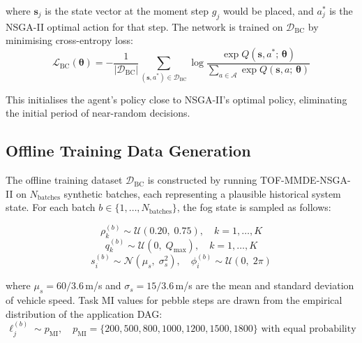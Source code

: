 \documentclass[12pt,a4paper]{article}
\theoremstyle{definition}
\theoremstyle{remark}
\begin{document}
where $\mathbf{s}_j$ is the state vector at the moment step $g_j$ would be
placed, and $a_j^*$ is the NSGA-II optimal action for that step. The network
is trained on $\mathcal{D}_{\text{BC}}$ by minimising cross-entropy loss:
\begin{equation}
  \mathcal{L}_{\text{BC}}(\bm{\theta}) =
  -\frac{1}{|\mathcal{D}_{\text{BC}}|}
  \sum_{(\mathbf{s}, a^*) \in \mathcal{D}_{\text{BC}}}
  \log \frac{\exp Q(\mathbf{s}, a^*;\, \bm{\theta})}
  {\sum_{a \in \mathcal{A}} \exp Q(\mathbf{s}, a;\, \bm{\theta})}
  \label{eq:bc_loss}
\end{equation}

This initialises the agent's policy close to NSGA-II's optimal policy,
eliminating the initial period of near-random decisions.

\subsection{Offline Training Data Generation}

The offline training dataset $\mathcal{D}_{\text{BC}}$ is constructed by
running TOF-MMDE-NSGA-II on $N_{\text{batches}}$ synthetic batches, each
representing a plausible historical system state. For each batch $b \in
\{1,\ldots,N_{\text{batches}}\}$, the fog state is sampled as follows:

\begin{equation}
  \rho_k^{(b)} \sim \mathcal{U}(0.20,\; 0.75),
  \quad k = 1,\ldots,K
  \label{eq:load_sample}
\end{equation}
\begin{equation}
  q_k^{(b)} \sim \mathcal{U}(0,\; Q_{\max}),
  \quad k = 1,\ldots,K
  \label{eq:queue_sample}
\end{equation}
\begin{equation}
  s_i^{(b)} \sim \mathcal{N}(\mu_s,\; \sigma_s^2),
  \quad \phi_i^{(b)} \sim \mathcal{U}(0,\; 2\pi)
  \label{eq:vehicle_sample}
\end{equation}

where $\mu_s = 60/3.6$\,m/s and $\sigma_s = 15/3.6$\,m/s are the mean and
standard deviation of vehicle speed. Task MI values for pebble steps are drawn
from the empirical distribution of the application DAG:
\begin{equation}
  \ell_j^{(b)} \sim p_{\text{MI}},
  \quad p_{\text{MI}} = \{200, 500, 800, 1000, 1200, 1500, 1800\}
  \text{ with equal probability}
  \label{eq:mi_sample}
\end{equation}
\end{document}
